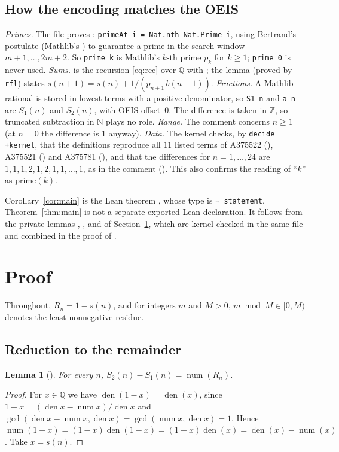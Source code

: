 \documentclass[11pt]{amsart}
\theoremstyle{plain}
\newtheorem{lemma}[theorem]{Lemma}
\theoremstyle{definition}
\newcommand{\N}{\mathbb{N}}
\newcommand{\Z}{\mathbb{Z}}
\newcommand{\Q}{\mathbb{Q}}
\DeclareMathOperator{\num}{num}
\DeclareMathOperator{\den}{den}
\begin{document}
\subsection{How the encoding matches the OEIS}
\emph{Primes.} The file proves : \texttt{primeAt i = Nat.nth Nat.Prime i}, using Bertrand's postulate (Mathlib's ) to guarantee a prime in the search window $m+1,\dots,2m+2$. So \texttt{prime k} is Mathlib's $k$-th prime $p_k$ for $k\ge1$; \texttt{prime 0} is never used.
\emph{Sums.}  is the recursion \eqref{eq:rec} over $\Q$ with ; the lemma  (proved by \texttt{rfl}) states $s(n+1)=s(n)+1/(p_{n+1}\,b(n+1))$.
\emph{Fractions.} A Mathlib rational is stored in lowest terms with a positive denominator, so \texttt{S1 n} and \texttt{a n} are $S_1(n)$ and $S_2(n)$, with OEIS offset~$0$. The difference is taken in $\Z$, so truncated subtraction in $\N$ plays no role.
\emph{Range.} The comment concerns $n\ge1$ (at $n=0$ the difference is $1$ anyway).
\emph{Data.} The kernel checks, by \texttt{decide +kernel}, that the definitions reproduce all $11$ listed terms of A375522 (), A375521 () and A375781 (), and that the differences for $n=1,\dots,24$ are $1,1,1,2,1,2,1,1,\dots,1$, as in the comment (). This also confirms the reading of ``$k$'' as $\mathrm{prime}(k)$.

Corollary~\ref{cor:main} is the Lean theorem , whose type is \texttt{¬ statement}. Theorem~\ref{thm:main} is not a separate exported Lean declaration. It follows from the private lemmas , ,  and  of Section~\ref{sec:proof}, which are kernel-checked in the same file and combined in the proof of .

\section{Proof}\label{sec:proof}

Throughout, $R_n=1-s(n)$, and for integers $m$ and $M>0$, $m\bmod M\in[0,M)$ denotes the least nonnegative residue.

\subsection{Reduction to the remainder}

\begin{lemma}[]\label{lem:diff}
For every $n$, $S_2(n)-S_1(n)=\num(R_n)$.
\end{lemma}
\begin{proof}
For $x\in\Q$ we have $\den(1-x)=\den(x)$, since $1-x=(\den x-\num x)/\den x$ and $\gcd(\den x-\num x,\den x)=\gcd(\num x,\den x)=1$. Hence
$\num(1-x)=(1-x)\den(1-x)=(1-x)\den(x)=\den(x)-\num(x)$. Take $x=s(n)$.
\end{proof}
\end{document}

